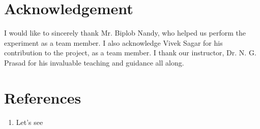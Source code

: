 \section{Acknowledgement}
	I would like to sincerely thank Mr. Biplob Nandy, who helped us perform the experiment as a team member. I also acknowledge Vivek Sagar for his contribution to the project, as a team member. I thank our instructor, Dr. N. G. Prasad for his invaluable teaching and guidance all along.

\section{References}
	\begin{enumerate}
		\item Let's see
	\end{enumerate}